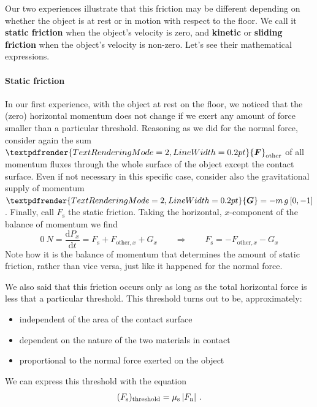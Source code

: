 \documentclass[a4paper,12pt,%
onecolumn,oneside,%
british%
]{memoir}
\renewcommand*{\bm}[1]{\textpdfrender{TextRenderingMode=2,LineWidth=0.2pt}{\boldsymbol{#1}}}
\newcommand*{\di}{\mathrm{d}}%
\DeclarePairedDelimiter\abs{\lvert}{\rvert}
\renewcommand*{\|}[1][]{\nonscript\:#1\vert\nonscript\:\mathopen{}}
\newcommand*{\yfris}{\mu_{\text{s}}}
\newcommand*{\yM}{m}%
\newcommand*{\yF}{\bm{F}}
\newcommand*{\yFn}{F_{\text{n}}}
\newcommand*{\yFs}{F_{\text{s}}}
\newcommand*{\yFr}{\yF_{\text{other}}}
\newcommand*{\yFrx}{F_{\text{other},x}}
\newcommand*{\yG}{\bm{G}}
\begin{document}
Our two experiences illustrate that this friction may be different depending on whether the object is at rest or in motion with respect to the floor. We call it \textbf{static friction} when the object's velocity is zero, and \textbf{kinetic} or \textbf{sliding friction} when the object's velocity is non-zero. Let's see their mathematical expressions.

\paragraph{Static friction}

In our first experience, with the object at rest on the floor, we noticed that the (zero) horizontal momentum does not change if we exert any amount of force smaller than a particular threshold. Reasoning as we did for the normal force, consider again the sum $\yFr$ of all momentum fluxes through the whole surface of the object except the contact surface. Even if not necessary in this specific case, consider also the gravitational supply of momentum $\yG=-\yM\,g\,[0,-1]$. Finally, call $\yFs$ the static friction. Taking the horizontal, $x$-component of the balance of momentum we find
\begin{equation*}
  \qty{0}{N} =
  \frac{\di P_{x}}{\di t}
  = \yFs + \yFrx + G_{x}
\qquad  \Longrightarrow\qquad
  \yFs = - \yFrx - G_{x}
\end{equation*}
Note how it is the balance of momentum that determines the amount of static friction, rather than vice versa, just like it happened for the normal force.

We also said that this friction occurs only as long as the total horizontal force is less that a particular threshold. This threshold turns out to be, approximately:
\begin{itemize}[nosep]
\item independent of the area of the contact surface
\item dependent on the nature of the two materials in contact
\item proportional to the normal force exerted on the object
\end{itemize}
We can express this threshold with the equation
\begin{equation*}
  (\yFs)_{\text{threshold}} = \yfris\, \abs{\yFn} \ .
\end{equation*}
\end{document}
